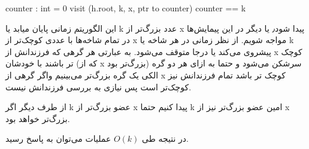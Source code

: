 \begin{latin}
	\begin{codebox}
	\li counter : int = 0
	\li visit (h.root, k, x, ptr to counter)
	\li \If counter == k \Then 
	\li \Return \true
	\li \Else 
	\li \Return \false
	\End
	\End
\end{codebox}

\end{latin}

این الگوریتم زمانی پایان میابد یا k عدد بزرگ‌تر از x پیدا شود٫ یا دیگر در این پیمایش‌ها در تمام شاخه‌ها با عددی کوچک‌تر از x مواجه شویم.
از نظر زمانی در هر شاخه یا k پیشروی می‌کند یا درجا متوقف می‌شود. به عبارتی هر گرهی که فرزندانش از x کوچک تر باشند با خودشان (که از x بزرگ‌تر بود)‌ سرشکن می‌شود و حتما به ازای هر دو گره الکی یک گره بزرگ‌تر می‌بینیم واگر گرهی از x کوچک تر باشد تمام فرزندانش نیز کوچک‌تر است پس نیازی به بررسی فرزندانش نیست.

از طرف دیگر
اگر k عضو بزرگ‌تر از x پیدا کنیم
حتما k امین عضو بزرگ‌تر نیز از x بزرگ‌تر خواهد بود.

در نتیجه طی $O(k)$ عملیات می‌توان به پاسخ رسید. 